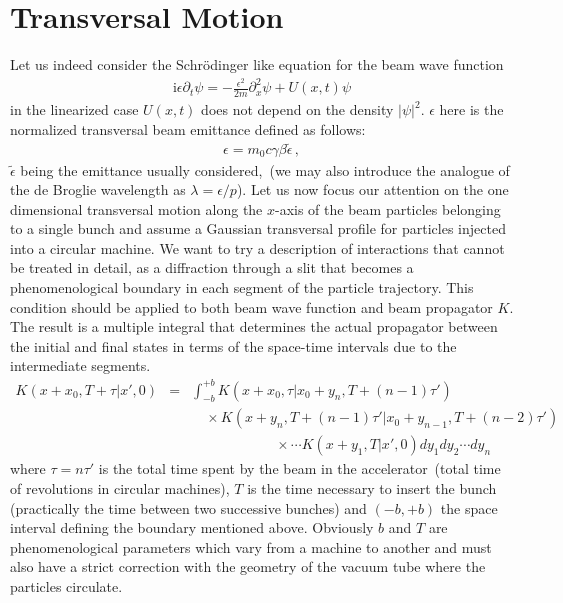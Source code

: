\documentclass[]{article}
\begin{document}
\section{Transversal Motion}
Let us indeed consider the Schr\"{o}dinger like equation for the beam
wave function
\begin{eqnarray}
\mathrm{i}\epsilon \partial _t \psi 
= - \frac{\epsilon^2}{2 m} \partial_x ^2 \psi + U \left( x , t \right) \psi
\label{schroedinger-like}
\end{eqnarray}
%
in the linearized case $U \left (x , t \right)$ does not depend on the 
density $\left| \psi \right|^2$. $\epsilon$ here is the normalized
transversal beam emittance defined as follows:
\begin{eqnarray}
\epsilon = m_0 c \gamma \beta \tilde{\epsilon}\,,
\label{epsilon}
\end{eqnarray}
%
$\tilde{\epsilon}$ being the emittance usually considered,~(we may also 
introduce the analogue of the de Broglie wavelength as
$\lambda = {\epsilon}/{p}$). Let us now focus our attention on the one 
dimensional transversal motion along the $x$-axis of the beam particles 
belonging to a single bunch and assume a Gaussian transversal profile 
for particles injected into a circular machine. We want to try a 
description of interactions that cannot be treated in detail, as a
diffraction through a slit that becomes a phenomenological boundary
in each segment of the particle trajectory. This condition should be 
applied to both beam wave function and beam
propagator $K$. The result is a multiple integral that determines the 
actual propagator between the initial and final states in terms of the 
space-time intervals due to the intermediate segments.
\begin{eqnarray}
K \left(x + x_0 , T + \tau | x' , 0 \right) 
& = &
\int_{- b}^{+ b}
K \left(x + x_0 , \tau | x_0 + y_n , T + (n - 1) \tau ' \right) \nonumber \\
& & \quad \times 
K \left(x + y_n , T + (n - 1) \tau ' | 
x_0 + y_{n - 1} , T + (n - 2) \tau ' \right) \nonumber \\
& & \qquad \qquad \qquad \times \cdots 
K \left(x + y_1 , T | x' , 0 \right) d y_1 d y_2 \cdots d y_n 
\label{integral}
\end{eqnarray}
%
where $\tau = n \tau '$ is the total time spent by the beam in the
accelerator~(total time of revolutions in circular machines), $T$ is the
time necessary to insert the bunch (practically the time between two
successive bunches) and $(-b , +b)$ the space interval defining the
boundary mentioned above. Obviously $b$ and $T$ are phenomenological 
parameters which vary from a machine to another and must also have a 
strict correction with the geometry of the vacuum tube where the particles
circulate.
\end{document}
